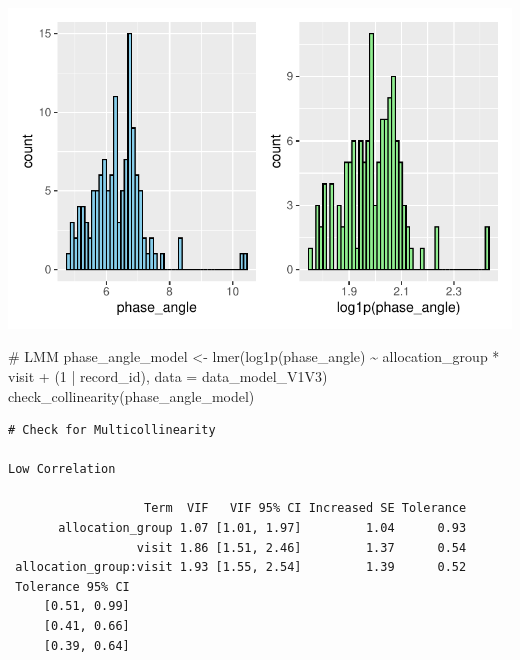 \documentclass[
  letterpaper,
  DIV=11,
  numbers=noendperiod]{scrartcl}
\newenvironment{Shaded}{\begin{snugshade}}{\end{snugshade}}
\newcommand{\AttributeTok}[1]{\textcolor[rgb]{0.40,0.45,0.13}{#1}}
\newcommand{\CommentTok}[1]{\textcolor[rgb]{0.37,0.37,0.37}{#1}}
\newcommand{\DecValTok}[1]{\textcolor[rgb]{0.68,0.00,0.00}{#1}}
\newcommand{\FunctionTok}[1]{\textcolor[rgb]{0.28,0.35,0.67}{#1}}
\newcommand{\NormalTok}[1]{\textcolor[rgb]{0.00,0.23,0.31}{#1}}
\newcommand{\OtherTok}[1]{\textcolor[rgb]{0.00,0.23,0.31}{#1}}
\newcommand{\SpecialCharTok}[1]{\textcolor[rgb]{0.37,0.37,0.37}{#1}}
\begin{document}
\includegraphics{Outcomes_V1V2V3_files/figure-pdf/phase_angle_1-1.pdf}

\begin{Shaded}
\begin{Highlighting}[]
\CommentTok{\# LMM}
\NormalTok{phase\_angle\_model }\OtherTok{\textless{}{-}} \FunctionTok{lmer}\NormalTok{(}\FunctionTok{log1p}\NormalTok{(phase\_angle) }\SpecialCharTok{\textasciitilde{}}\NormalTok{ allocation\_group }\SpecialCharTok{*}\NormalTok{ visit }\SpecialCharTok{+}\NormalTok{ (}\DecValTok{1} \SpecialCharTok{|}\NormalTok{ record\_id), }\AttributeTok{data =}\NormalTok{ data\_model\_V1V3)}
\FunctionTok{check\_collinearity}\NormalTok{(phase\_angle\_model)}
\end{Highlighting}
\end{Shaded}

\begin{verbatim}
# Check for Multicollinearity

Low Correlation

                   Term  VIF   VIF 95% CI Increased SE Tolerance
       allocation_group 1.07 [1.01, 1.97]         1.04      0.93
                  visit 1.86 [1.51, 2.46]         1.37      0.54
 allocation_group:visit 1.93 [1.55, 2.54]         1.39      0.52
 Tolerance 95% CI
     [0.51, 0.99]
     [0.41, 0.66]
     [0.39, 0.64]
\end{verbatim}
\end{document}
